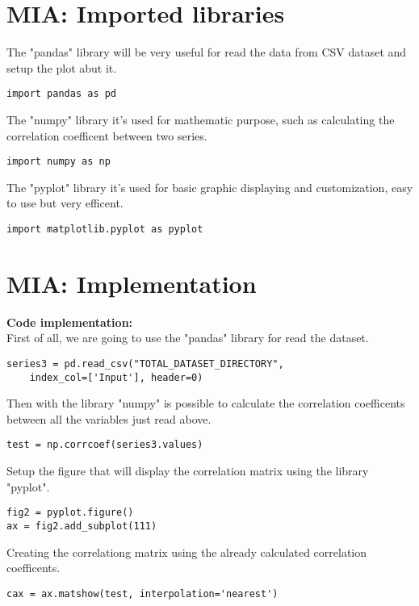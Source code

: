 \label{MIA_Implementation}
\section{MIA: Imported libraries}
\label{MIA_Libraries}
The "pandas" library will be very useful for read the data from CSV dataset and setup the plot abut it.
\begin{lstlisting}
import pandas as pd
\end{lstlisting}

The "numpy" library it's used for mathematic purpose, such as calculating the correlation coefficent between two series.
\begin{lstlisting}
import numpy as np
\end{lstlisting}

 
The "pyplot" library it's used for basic graphic displaying and customization, easy to use but very efficent.
\begin{lstlisting}
import matplotlib.pyplot as pyplot
\end{lstlisting}

\section{MIA: Implementation}
\textbf{Code implementation:}\\
First of all, we are going to use the "pandas" library for read the dataset.
\begin{lstlisting}
series3 = pd.read_csv("TOTAL_DATASET_DIRECTORY", 
	index_col=['Input'], header=0)
\end{lstlisting}

Then with the library "numpy" is possible to calculate the correlation coefficents between all the variables just read above.
\begin{lstlisting}
test = np.corrcoef(series3.values)
\end{lstlisting}

Setup the figure that will display the correlation matrix using the library "pyplot".
\begin{lstlisting}
fig2 = pyplot.figure()
ax = fig2.add_subplot(111)
\end{lstlisting}

Creating the correlationg matrix using the already calculated correlation coefficents.
\begin{lstlisting}
cax = ax.matshow(test, interpolation='nearest')
\end{lstlisting}

